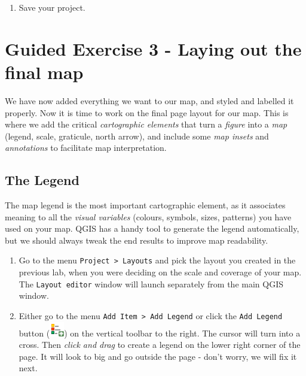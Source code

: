 \documentclass[
  letterpaper,
  DIV=11,
  numbers=noendperiod]{scrreprt}
\providecommand{\tightlist}{%
  \setlength{\itemsep}{0pt}\setlength{\parskip}{0pt}}\usepackage{longtable,booktabs,array}
\begin{document}
\begin{enumerate}
\def\labelenumi{(\arabic{enumi})}
\setcounter{enumi}{237}
\tightlist
\item
  Save your project.
\end{enumerate}

\section{Guided Exercise 3 - Laying out the final
map}\label{guided-exercise-3---laying-out-the-final-map}

We have now added everything we want to our map, and styled and labelled
it properly. Now it is time to work on the final page layout for our
map. This is where we add the critical \emph{cartographic elements} that
turn a \emph{figure} into a \emph{map} (legend, scale, graticule, north
arrow), and include some \emph{map insets} and \emph{annotations} to
facilitate map interpretation.

\subsection{The Legend}\label{the-legend}

The map legend is the most important cartographic element, as it
associates meaning to all the \emph{visual variables} (colours, symbols,
sizes, patterns) you have used on your map. QGIS has a handy tool to
generate the legend automatically, but we should always tweak the end
results to improve map readability.

\begin{enumerate}
\def\labelenumi{(\arabic{enumi})}
\setcounter{enumi}{238}
\item
  Go to the menu \texttt{Project\ \textgreater{}\ Layouts} and pick the
  layout you created in the previous lab, when you were deciding on the
  scale and coverage of your map. The \texttt{Layout\ editor} window
  will launch separately from the main QGIS window.
\item
  Either go to the menu \texttt{Add\ Item\ \textgreater{}\ Add\ Legend}
  or click the \texttt{Add\ Legend} button
  (\includegraphics{index_files/mediabag/mActionAddLegend.png}) on the
  vertical toolbar to the right. The cursor will turn into a cross. Then
  \emph{click and drag} to create a legend on the lower right corner of
  the page. It will look to big and go outside the page - don't worry,
  we will fix it next.
\end{enumerate}
\end{document}
